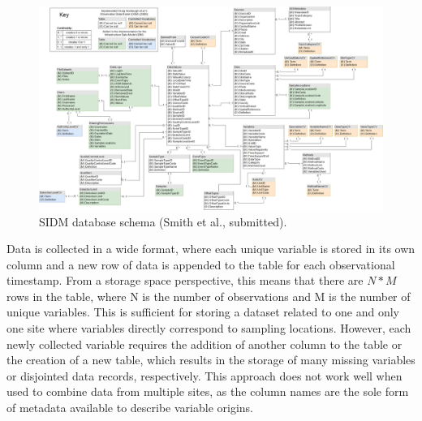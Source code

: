 \begin{figure}[ht]
	\centering
	\includegraphics[width=\textwidth]{gfx/chapter-storage/idm_schema.png}
	\caption[SIDM database schema.]{SIDM database schema (Smith et al., submitted).}
	\label{fig:idm-schema}
\end{figure}

Data is collected in a wide format, where each unique variable is stored in its own column and a new row of data is appended to the table for each observational timestamp.
From a storage space perspective, this means that there are $N*M$ rows in the table, where N is the number of observations and M is the number of unique variables.
This is sufficient for storing a dataset related to one and only one site where variables directly correspond to sampling locations.
However, each newly collected variable requires the addition of another column to the table or the creation of a new table, which results in the storage of many missing variables or disjointed data records, respectively.
This approach does not work well when used to combine data from multiple sites, as the column names are the sole form of metadata available to describe variable origins.

